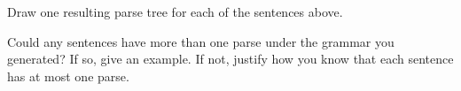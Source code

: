 \documentclass[11pt,letterpaper,boxed]{hmcpset}
\begin{document}
\begin{solution}
\vspace{6cm}
\end{solution}

\begin{problem}
Draw one resulting parse tree for each of the sentences above.
\end{problem}

\begin{solution}
\vspace{6cm}
\end{solution}


\begin{problem}
Could any sentences have more than one parse under the grammar you
generated? If so, give an example. If not, justify how you know that
each sentence has at most one parse.
\end{problem}

\begin{solution}
\vspace{6cm}
\end{solution}
\end{document}
